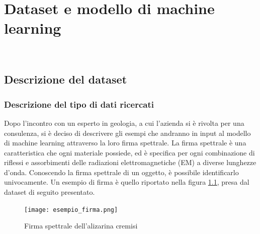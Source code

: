
\chapter{Dataset e modello di machine learning}
\label{cap:machine-learning}

\\

\section{Descrizione del dataset}
\subsection{Descrizione del tipo di dati ricercati}
Dopo l'incontro con un esperto in geologia, a cui l'azienda si è rivolta per una consulenza, si è deciso di descrivere gli esempi che andranno in input al modello di machine learning attraverso la loro firma spettrale.
La firma spettrale è una caratteristica che ogni materiale possiede, ed è specifica per ogni combinazione di riflessi e assorbimenti delle radiazioni elettromagnetiche (EM) a diverse lunghezze d'onda. Conoscendo la firma spettrale di un oggetto, è possibile identificarlo univocamente.
Un esempio di firma è quello riportato nella figura \ref{fig:esempio_firma}, presa dal dataset di seguito presentato.
\begin{figure}
    \centering
    \texttt{[image: esempio\_firma.png]}
    \caption{Firma spettrale dell'alizarina cremisi}
    \label{fig:esempio_firma}
\end{figure}


